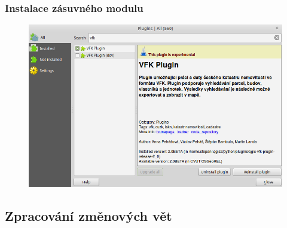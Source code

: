 \documentclass{beamer}
\begin{document}
\begin{frame}
\frametitle{Instalace zásuvného modulu}

\begin{figure}
  \includegraphics[width=.9\textwidth]{images/qgis_plugin_vyhledani.png}
\end{figure}

\end{frame}


\subsection{Zpracování změnových vět}
\end{document}
